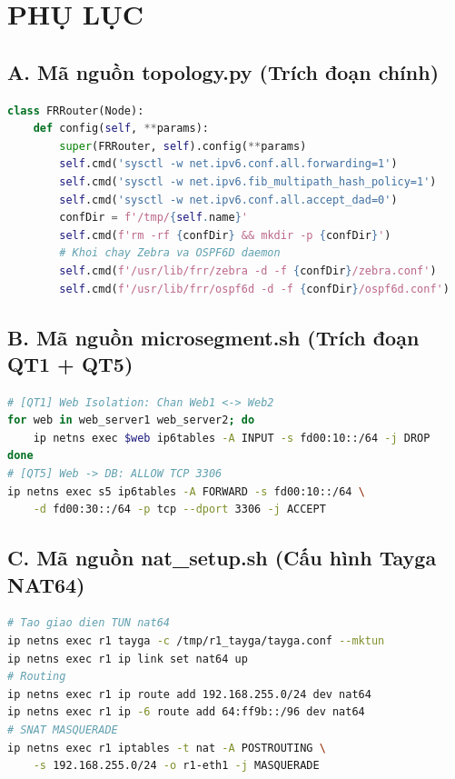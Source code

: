 \section*{PHỤ LỤC}

\subsection*{A. Mã nguồn topology.py (Trích đoạn chính)}
\begin{lstlisting}[style=customcode, language=Python, caption={Lớp FRRouter -- Thiết bị định tuyến trên Mininet.}]
class FRRouter(Node):
    def config(self, **params):
        super(FRRouter, self).config(**params)
        self.cmd('sysctl -w net.ipv6.conf.all.forwarding=1')
        self.cmd('sysctl -w net.ipv6.fib_multipath_hash_policy=1')
        self.cmd('sysctl -w net.ipv6.conf.all.accept_dad=0')
        confDir = f'/tmp/{self.name}'
        self.cmd(f'rm -rf {confDir} && mkdir -p {confDir}')
        # Khoi chay Zebra va OSPF6D daemon
        self.cmd(f'/usr/lib/frr/zebra -d -f {confDir}/zebra.conf')
        self.cmd(f'/usr/lib/frr/ospf6d -d -f {confDir}/ospf6d.conf')
\end{lstlisting}

\subsection*{B. Mã nguồn microsegment.sh (Trích đoạn QT1 + QT5)}
\begin{lstlisting}[style=customcode, language=bash, caption={Zero Trust: Cách ly Web và Bảo vệ Database.}]
# [QT1] Web Isolation: Chan Web1 <-> Web2
for web in web_server1 web_server2; do
    ip netns exec $web ip6tables -A INPUT -s fd00:10::/64 -j DROP
done
# [QT5] Web -> DB: ALLOW TCP 3306
ip netns exec s5 ip6tables -A FORWARD -s fd00:10::/64 \
    -d fd00:30::/64 -p tcp --dport 3306 -j ACCEPT
\end{lstlisting}

\subsection*{C. Mã nguồn nat\_setup.sh (Cấu hình Tayga NAT64)}
\begin{lstlisting}[style=customcode, language=bash, caption={Cấu hình NAT64 trên Border Router R1.}]
# Tao giao dien TUN nat64
ip netns exec r1 tayga -c /tmp/r1_tayga/tayga.conf --mktun
ip netns exec r1 ip link set nat64 up
# Routing
ip netns exec r1 ip route add 192.168.255.0/24 dev nat64
ip netns exec r1 ip -6 route add 64:ff9b::/96 dev nat64
# SNAT MASQUERADE
ip netns exec r1 iptables -t nat -A POSTROUTING \
    -s 192.168.255.0/24 -o r1-eth1 -j MASQUERADE
\end{lstlisting}
